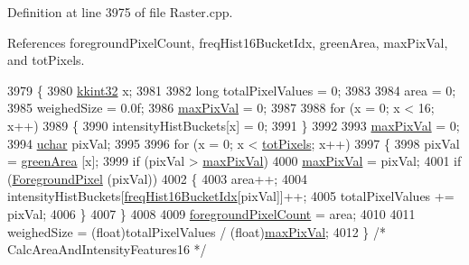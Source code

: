 Definition at line 3975 of file Raster.\+cpp.



References foreground\+Pixel\+Count, freq\+Hist16\+Bucket\+Idx, green\+Area, max\+Pix\+Val, and tot\+Pixels.


\begin{DoxyCode}
3979 \{
3980   \hyperlink{namespace_k_k_b_a8fa4952cc84fda1de4bec1fbdd8d5b1b}{kkint32}  x;
3981 
3982   \textcolor{keywordtype}{long}  totalPixelValues = 0;
3983 
3984   area               = 0;
3985   weighedSize        = 0.0f;
3986   \hyperlink{class_k_k_b_1_1_raster_a4f37d3b83826f522f61af0918a1d5546}{maxPixVal}          = 0;
3987 
3988   \textcolor{keywordflow}{for}  (x = 0;  x < 16;  x++)
3989   \{
3990    intensityHistBuckets[x] = 0;
3991   \}
3992 
3993   \hyperlink{class_k_k_b_1_1_raster_a4f37d3b83826f522f61af0918a1d5546}{maxPixVal} = 0;
3994   \hyperlink{namespace_k_k_b_ace9969169bf514f9ee6185186949cdf7}{uchar}  pixVal;
3995 
3996   \textcolor{keywordflow}{for}  (x = 0;  x < \hyperlink{class_k_k_b_1_1_raster_a9b08c4a0ca0a35435a478599635f1dc0}{totPixels};  x++)
3997   \{
3998     pixVal = \hyperlink{class_k_k_b_1_1_raster_ad981258f1f7284a8bd0cd0466f328cdf}{greenArea} [x];
3999     \textcolor{keywordflow}{if}  (pixVal > \hyperlink{class_k_k_b_1_1_raster_a4f37d3b83826f522f61af0918a1d5546}{maxPixVal})
4000       \hyperlink{class_k_k_b_1_1_raster_a4f37d3b83826f522f61af0918a1d5546}{maxPixVal} = pixVal;
4001     \textcolor{keywordflow}{if}  (\hyperlink{class_k_k_b_1_1_raster_aa1e1363589e719eb64f0957281b84b6a}{ForegroundPixel} (pixVal))
4002     \{
4003       area++;
4004       intensityHistBuckets[\hyperlink{_raster_8cpp_ab019f0b1d3a4bd98c990d75ca190d067}{freqHist16BucketIdx}[pixVal]]++;
4005       totalPixelValues += pixVal;
4006     \}
4007   \}
4008 
4009   \hyperlink{class_k_k_b_1_1_raster_aa7e86253f4b9c347da718732e44b60e8}{foregroundPixelCount} = area;
4010 
4011   weighedSize = (float)totalPixelValues / (\textcolor{keywordtype}{float})\hyperlink{class_k_k_b_1_1_raster_a4f37d3b83826f522f61af0918a1d5546}{maxPixVal};
4012 \}  \textcolor{comment}{/* CalcAreaAndIntensityFeatures16 */}
\end{DoxyCode}
